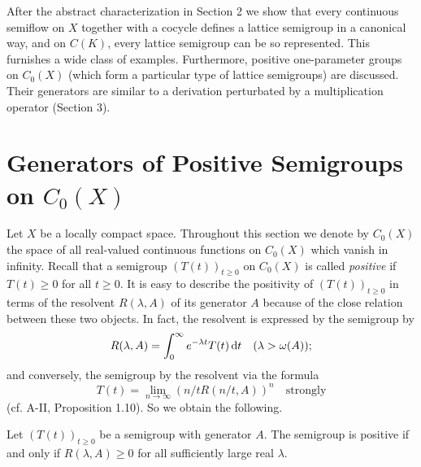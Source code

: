 
After the abstract characterization in Section 2 we show that every continuous semiflow on $X$ together with a cocycle defines a lattice semigroup in a canonical way, and on $C(K)$, every lattice semigroup can be so represented.
This furnishes a wide class of examples.
Furthermore, positive one-parameter groups on $C_{0}(X)$ (which form a particular type of lattice semigroups) are discussed.
Their generators are similar to a derivation perturbated by a multiplication operator (Section 3).

\section{Generators of Positive Semigroups on  \texorpdfstring{$C_{0}(X)$}{C(X)}} \label{sec:b2-1}

Let $X$ be a locally compact space.
Throughout this section we denote by $C_{0}(X)$ the space of all real-valued continuous functions on $C_{0}(X)$ which vanish in infinity.
Recall that a semigroup $(T(t))_{t \geq 0}$ on $C_{0}(X)$ is called \emph{positive} if $T(t) \geq 0$ for all $t \geq 0$.
It is easy to describe the positivity of $(T(t))_{t \geq 0}$ in terms of the resolvent $R(\lambda,A)$ of its generator $A$ because of the close relation between these two objects.
In fact, the resolvent is expressed by the semigroup by
\begin{equation}\label{eq:b2-1.1}
R(\lambda,A) = \int_{0}^{\infty} e^{-\lambda t} T(t) \mathop{}\!\mathrm{d}{t} \quad (\lambda > \omega(A));
\end{equation}
and conversely, the semigroup by the resolvent via the formula
\begin{equation}\label{eq:b2-1.2}
T(t) = \lim_{n \to \infty} (n/tR(n/t,A))^{n} \quad \text{strongly}
\end{equation}
(cf. A-II, Proposition 1.10).
So we obtain the following.

\begin{proposition}\label{prop:b2-1.1}
Let $(T(t))_{t \geq 0}$ be a semigroup with generator $A$.
The semigroup is positive if and only if $R(\lambda,A) \geq 0$ for all sufficiently large real $\lambda$.
\end{proposition}

